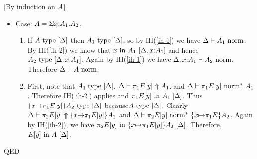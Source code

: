 \documentclass{article}
\theoremstyle{break}
\newcommand{\qed}{\mbox{QED}}
\newenvironment{proof}{\noindent{\bf Proof:}\hspace*{0.5em}}{\hspace*{\fill}\qed}
\begin{document}
\begin{proof}[By induction on $\kind$]
\begin{itemize}
\item Case: $\kind=\ksigma{\cvar}{\kind_1}{\kind_2}$.
\begin{enumerate}
\item If $\semanticvalidtype{\world}{\kind}$ then
$\semanticvalidtype{\world}{\kind_1}$, so by IH(\ref{ih-1}) we
have $\normtype{\world}{\kind_1}$.  By IH(\ref{ih-2}) we know
that $\semanticvalidterm{\world,\cvar{:}{\kind_1}}{\cvar}{\kind_1}$
and hence $\semanticvalidtype{\world,\cvar{:}\kind_1}{\kind_2}$.
Again by IH(\ref{ih-1}) we have
$\normtype{\world,\cvar{:}\kind_1}{\kind_2}$.  Therefore 
$\normtype{\world}{\kind}$.

\item First, note that $\semanticvalidtype{\world}{\kind_1}$, 
$\reconstruct{\world}{\cpi{1}{E[\othercvar]}}{\kind_1}$, and 
$\normE{\world}{\cpi{1}{E[\othercvar]}}{\kind_1}$.  Therefore
IH(\ref{ih-2}) applies and
$\semanticvalidterm{\world}{\cpi{1}{E[\othercvar]}}{\kind_1}$.
Thus $\semanticvalidtype{\world}{\substitute{\cvar}{\cpi{1}{E[\othercvar]}}{\kind_2}}$
because$\semanticvalidtype{\world}{\kind}$.
Clearly 
$\reconstruct{\world}{\cpi{2}{E[\othercvar]}}{\substitute{\cvar}{\cpi{1}{E[\othercvar]}}\kind_2}$
and
$\normE{\world}{\cpi{2}{E[\othercvar]}}{\substitute{\cvar}{\cpi{1}{E}}\kind_2}$.
Again by IH(\ref{ih-2}), we have
$\semanticvalidterm{\world}{\cpi{2}{E[\othercvar]}}{\substitute{\cvar}{\cpi{1}{E[\othercvar]}}{\kind_2}}$.
Therefore, $\semanticvalidterm{\world}{E[\othercvar]}{\kind}$.


\end{enumerate}
\end{itemize}
\end{proof}
\end{document}
